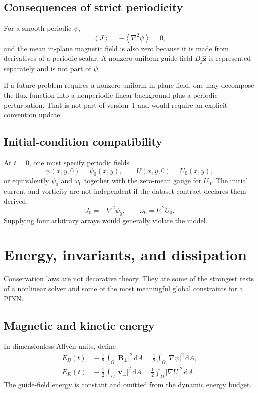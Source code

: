 \documentclass[11pt]{article}
\newcommand{\dd}{\mathrm{d}}
\newcommand{\vect}[1]{\bm{#1}}
\newcommand{\average}[1]{\left\langle #1\right\rangle}
\begin{document}
\subsection{Consequences of strict periodicity}

For a smooth periodic $\psi$,
\begin{equation}
\average{J}=-\average{\nabla^2\psi}=0,
\end{equation}
and the mean in-plane magnetic field is also zero because it is made from derivatives of a periodic scalar. A nonzero uniform guide field $B_g\widehat{\vect{z}}$ is represented separately and is not part of $\psi$.

If a future problem requires a nonzero uniform in-plane field, one may decompose the flux function into a nonperiodic linear background plus a periodic perturbation. That is not part of version~1 and would require an explicit convention update.

\subsection{Initial-condition compatibility}

At $t=0$, one must specify periodic fields
\begin{equation}
\psi(x,y,0)=\psi_0(x,y),
\qquad
U(x,y,0)=U_0(x,y),
\end{equation}
or equivalently $\psi_0$ and $\omega_0$ together with the zero-mean gauge for $U_0$. The initial current and vorticity are not independent if the dataset contract declares them derived:
\begin{equation}
J_0=-\nabla^2\psi_0,
\qquad
\omega_0=\nabla^2U_0.
\end{equation}
Supplying four arbitrary arrays would generally violate the model.

\section{Energy, invariants, and dissipation}
\label{sec:energy}

Conservation laws are not decorative theory. They are some of the strongest tests of a nonlinear solver and some of the most meaningful global constraints for a PINN.

\subsection{Magnetic and kinetic energy}

In dimensionless Alfv\'en units, define
\begin{align}
E_B(t)&\equiv\frac{1}{2}\int_\Omega|\vect{B}_\perp|^2\,\dd A
=\frac{1}{2}\int_\Omega|\nabla\psi|^2\,\dd A,
\label{eq:EBdef}\\
E_K(t)&\equiv\frac{1}{2}\int_\Omega|\vect{v}_\perp|^2\,\dd A
=\frac{1}{2}\int_\Omega|\nabla U|^2\,\dd A.
\label{eq:EKdef}
\end{align}
The guide-field energy is constant and omitted from the dynamic energy budget.
\end{document}
